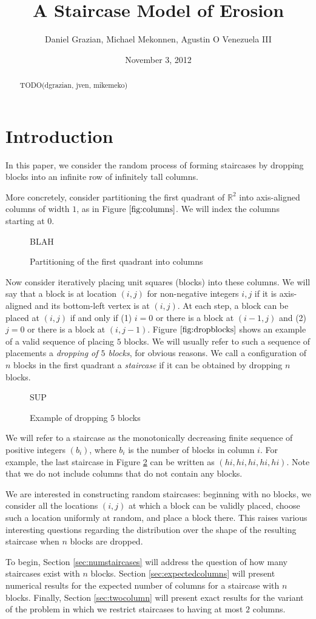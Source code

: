 \documentclass[12pt]{amsart}
\title{A Staircase Model of Erosion}
\author{Daniel Grazian, Michael Mekonnen, Agustin O Venezuela III}
\date{November 3, 2012}
\newcommand{\R}{\mathbb{R}}
\newcommand{\newfigure}[3]{
\begin{figure}
#3
\caption{#2 \label{#1}}
\end{figure}
}
\newcommand{\newsection}[2]{
\section{#1 \label{#2}}
}
\begin{document}
\begin{abstract}
TODO(dgrazian, jven, mikemeko)
\end{abstract}

\maketitle

\newsection{Introduction}{sec:intro}
In this paper, we consider the random process of forming staircases by dropping blocks into an infinite row of infinitely tall columns.

More concretely, consider partitioning the first quadrant of $\R^2$ into axis-aligned columns of width $1$, as in Figure $\ref{fig:columns}$. We will index the columns starting at $0$.

\newfigure{fig:columns}{Partitioning of the first quadrant into columns}{
BLAH
}

Now consider iteratively placing unit squares (blocks) into these columns. We will say that a block is at location $(i, j)$ for non-negative integers $i, j$ if it is axis-aligned and its bottom-left vertex is at $(i, j)$. At each step, a block can be placed at $(i, j)$ if and only if (1) $i = 0$ or there is a block at $(i - 1, j)$ and (2) $j = 0$ or there is a block at $(i, j - 1)$. Figure $\ref{fig:dropblocks}$ shows an example of a valid sequence of placing $5$ blocks. We will usually refer to such a sequence of placements a \textit{dropping of $5$ blocks}, for obvious reasons. We call a configuration of $n$ blocks in the first quadrant a \textit{staircase} if it can be obtained by dropping $n$ blocks.

\newfigure{fig:dropblocks}{Example of dropping $5$ blocks}{
SUP
}

We will refer to a staircase as the monotonically decreasing finite sequence of positive integers $(b_i)$, where $b_i$ is the number of blocks in column $i$. For example, the last staircase in Figure \ref{fig:dropblocks} can be written as $(hi,hi,hi,hi,hi)$. Note that we do not include columns that do not contain any blocks.

We are interested in constructing random staircases: beginning with no blocks, we consider all the locations $(i, j)$ at which a block can be validly placed, choose such a location uniformly at random, and place a block there. This raises various interesting questions regarding the distribution over the shape of the resulting staircase when $n$ blocks are dropped.

To begin, Section \ref{sec:numstaircases} will address the question of how many staircases exist with $n$ blocks. Section \ref{sec:expectedcolumns} will present numerical results for the expected number of columns for a staircase with $n$ blocks. Finally, Section \ref{sec:twocolumn} will present exact results for the variant of the problem in which we restrict staircases to having at most $2$ columns.
\end{document}
